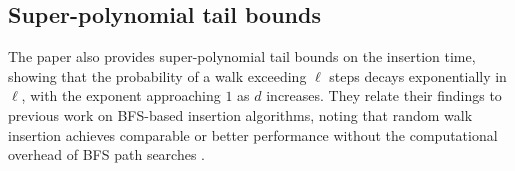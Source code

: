 \subsection{Super-polynomial tail bounds}
The paper also provides super-polynomial tail bounds on the insertion time, showing that the probability of a walk exceeding $\ell$ steps decays exponentially in $\ell$, with the exponent approaching $1$ as $d$ increases. They relate their findings to previous work on BFS-based insertion algorithms, noting that random walk insertion achieves comparable or better performance without the computational overhead of BFS path searches \cite{10756020}.